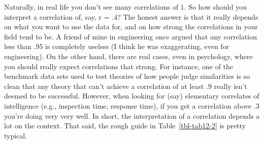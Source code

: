 \documentclass[
  a4paper,
]{book}
\begin{document}
Naturally, in real life you don't see many correlations of \(1\). So how
should you interpret a correlation of, say, r = \(.4\)? The honest
answer is that it really depends on what you want to use the data for,
and on how strong the correlations in your field tend to be. A friend of
mine in engineering once argued that any correlation less than \(.95\)
is completely useless (I think he was exaggerating, even for
engineering). On the other hand, there are real cases, even in
psychology, where you should really expect correlations that strong. For
instance, one of the benchmark data sets used to test theories of how
people judge similarities is so clean that any theory that can't achieve
a correlation of at least \(.9\) really isn't deemed to be successful.
However, when looking for (say) elementary correlates of intelligence
(e.g., inspection time, response time), if you get a correlation above
\(.3\) you're doing very very well. In short, the interpretation of a
correlation depends a lot on the context. That said, the rough guide in
Table~\ref{tbl-tab12-2} is pretty typical.

\hypertarget{tbl-tab12-2}{}
 
  \providecommand{\huxb}[2]{\arrayrulecolor[RGB]{#1}\global\arrayrulewidth=#2pt}
  \providecommand{\huxvb}[2]{\color[RGB]{#1}\vrule width #2pt}
  \providecommand{\huxtpad}[1]{\rule{0pt}{#1}}
  \providecommand{\huxbpad}[1]{\rule[-#1]{0pt}{#1}}
\end{document}
